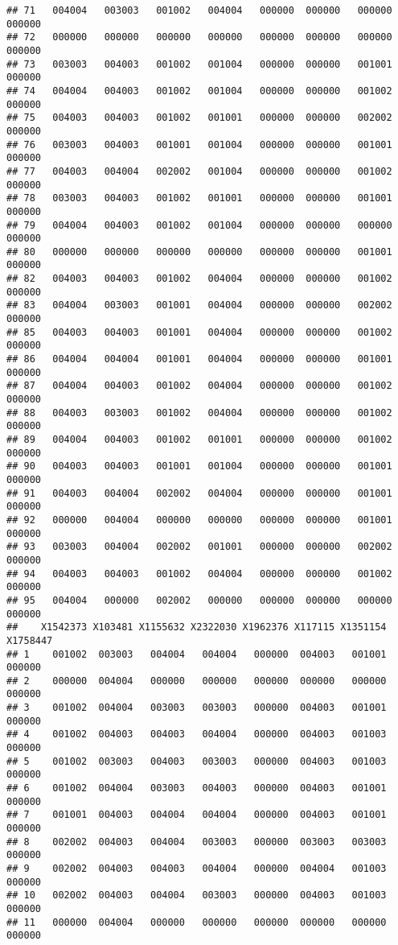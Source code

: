 \documentclass[
]{article}
\begin{document}
\begin{verbatim}
## 71   004004   003003   001002   004004   000000  000000   000000  000000
## 72   000000   000000   000000   000000   000000  000000   000000  000000
## 73   003003   004003   001002   001004   000000  000000   001001  000000
## 74   004004   004003   001002   001004   000000  000000   001002  000000
## 75   004003   004003   001002   001001   000000  000000   002002  000000
## 76   003003   004003   001001   001004   000000  000000   001001  000000
## 77   004003   004004   002002   001004   000000  000000   001002  000000
## 78   003003   004003   001002   001001   000000  000000   001001  000000
## 79   004004   004003   001002   001004   000000  000000   000000  000000
## 80   000000   000000   000000   000000   000000  000000   001001  000000
## 82   004003   004003   001002   004004   000000  000000   001002  000000
## 83   004004   003003   001001   004004   000000  000000   002002  000000
## 85   004003   004003   001001   004004   000000  000000   001002  000000
## 86   004004   004004   001001   004004   000000  000000   001001  000000
## 87   004004   004003   001002   004004   000000  000000   001002  000000
## 88   004003   003003   001002   004004   000000  000000   001002  000000
## 89   004004   004003   001002   001001   000000  000000   001002  000000
## 90   004003   004003   001001   001004   000000  000000   001001  000000
## 91   004003   004004   002002   004004   000000  000000   001001  000000
## 92   000000   004004   000000   000000   000000  000000   001001  000000
## 93   003003   004004   002002   001001   000000  000000   002002  000000
## 94   004003   004003   001002   004004   000000  000000   001002  000000
## 95   004004   000000   002002   000000   000000  000000   000000  000000
##    X1542373 X103481 X1155632 X2322030 X1962376 X117115 X1351154 X1758447
## 1    001002  003003   004004   004004   000000  004003   001001   000000
## 2    000000  004004   000000   000000   000000  000000   000000   000000
## 3    001002  004004   003003   003003   000000  004003   001001   000000
## 4    001002  004003   004003   004004   000000  004003   001003   000000
## 5    001002  003003   004003   003003   000000  004003   001003   000000
## 6    001002  004004   003003   004003   000000  004003   001001   000000
## 7    001001  004003   004004   004004   000000  004003   001001   000000
## 8    002002  004003   004004   003003   000000  003003   003003   000000
## 9    002002  004003   004003   004004   000000  004004   001003   000000
## 10   002002  004003   004004   003003   000000  004003   001003   000000
## 11   000000  004004   000000   000000   000000  000000   000000   000000

\end{verbatim}
\end{document}
